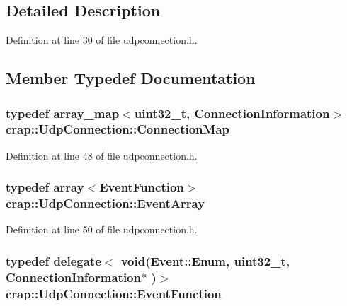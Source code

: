 \subsection{Detailed Description}


Definition at line 30 of file udpconnection.\+h.



\subsection{Member Typedef Documentation}
\hypertarget{classcrap_1_1_udp_connection_a2182c50061f2f64c874b4e74a4de64e9}{}
\subsubsection[{Connection\+Map}]{\setlength{\rightskip}{0pt plus 5cm}typedef {\bf array\+\_\+map}$<$uint32\+\_\+t, {\bf Connection\+Information}$>$ {\bf crap\+::\+Udp\+Connection\+::\+Connection\+Map}}\label{classcrap_1_1_udp_connection_a2182c50061f2f64c874b4e74a4de64e9}


Definition at line 48 of file udpconnection.\+h.

\hypertarget{classcrap_1_1_udp_connection_a19d68a5229c759dd795467a73fec47fd}{}
\subsubsection[{Event\+Array}]{\setlength{\rightskip}{0pt plus 5cm}typedef {\bf array}$<${\bf Event\+Function}$>$ {\bf crap\+::\+Udp\+Connection\+::\+Event\+Array}}\label{classcrap_1_1_udp_connection_a19d68a5229c759dd795467a73fec47fd}


Definition at line 50 of file udpconnection.\+h.

\hypertarget{classcrap_1_1_udp_connection_afd162aa96fdbc4cada668fda39a34bf7}{}
\subsubsection[{Event\+Function}]{\setlength{\rightskip}{0pt plus 5cm}typedef {\bf delegate}$<$ void({\bf Event\+::\+Enum}, uint32\+\_\+t, {\bf Connection\+Information}$\ast$ )$>$ {\bf crap\+::\+Udp\+Connection\+::\+Event\+Function}}\label{classcrap_1_1_udp_connection_afd162aa96fdbc4cada668fda39a34bf7}


